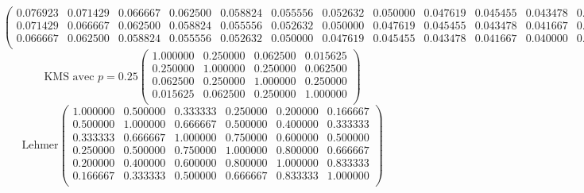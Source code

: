 \documentclass{report}
\begin{document}
\begin{equation}
\begin{pmatrix}
	  0.076923 & 0.071429 & 0.066667 & 0.062500 & 0.058824 & 0.055556 & 0.052632 & 0.050000 & 0.047619 & 0.045455 & 0.043478 & 0.041667 & 0.040000 & 0.038462 & 0.037037 \\ 
	  0.071429 & 0.066667 & 0.062500 & 0.058824 & 0.055556 & 0.052632 & 0.050000 & 0.047619 & 0.045455 & 0.043478 & 0.041667 & 0.040000 & 0.038462 & 0.037037 & 0.035714 \\ 
	  0.066667 & 0.062500 & 0.058824 & 0.055556 & 0.052632 & 0.050000 & 0.047619 & 0.045455 & 0.043478 & 0.041667 & 0.040000 & 0.038462 & 0.037037 & 0.035714 & 0.034483 \\ 
	\end{pmatrix}
	\label{syst5}
      \end{equation}
      \normalsize
      \begin{equation}
	\text{KMS avec $p=0.25$}
	\begin{pmatrix}
	  1.000000 & 0.250000 & 0.062500 & 0.015625 \\ 
	  0.250000 & 1.000000 & 0.250000 & 0.062500 \\ 
	  0.062500 & 0.250000 & 1.000000 & 0.250000 \\ 
	  0.015625 & 0.062500 & 0.250000 & 1.000000 \\ 
	\end{pmatrix}
	\label{syst6}
      \end{equation}
      \begin{equation}
	\text{Lehmer}
	\begin{pmatrix}
	  1.000000 & 0.500000 & 0.333333 & 0.250000 & 0.200000 & 0.166667 \\ 
	  0.500000 & 1.000000 & 0.666667 & 0.500000 & 0.400000 & 0.333333 \\ 
	  0.333333 & 0.666667 & 1.000000 & 0.750000 & 0.600000 & 0.500000 \\ 
	  0.250000 & 0.500000 & 0.750000 & 1.000000 & 0.800000 & 0.666667 \\ 
	  0.200000 & 0.400000 & 0.600000 & 0.800000 & 1.000000 & 0.833333 \\ 
	  0.166667 & 0.333333 & 0.500000 & 0.666667 & 0.833333 & 1.000000 \\ 
	\end{pmatrix}
	\label{syst7}
      \end{equation}
\end{document}
